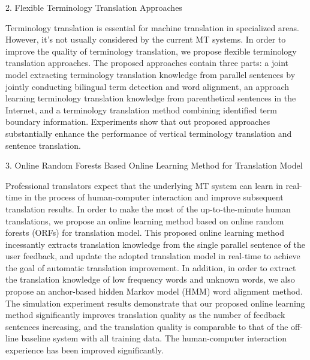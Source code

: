 2. Flexible Terminology Translation Approaches

Terminology translation is essential for machine translation in specialized areas. However, it’s not usually considered by the current MT systems. In order to improve the quality of terminology translation, we propose flexible terminology translation approaches. The proposed approaches contain three parts: a joint model extracting terminology translation knowledge from parallel sentences by jointly conducting bilingual term detection and word alignment, an approach learning terminology translation knowledge from parenthetical sentences in the Internet, and a terminology translation method combining identified term boundary information. Experiments show that out proposed approaches substantially enhance the performance of vertical terminology translation and sentence translation.

3. Online Random Forests Based Online Learning Method for Translation Model

Professional translators expect that the underlying MT system can learn in real-time in the process of human-computer interaction and improve subsequent translation results. In order to make the most of the up-to-the-minute human translations, we propose an online learning method based on online random forests (ORFs) for translation model. This proposed online learning method incessantly extracts translation knowledge from the single parallel sentence of the user feedback, and update the adopted translation model in real-time to achieve the goal of automatic translation improvement. In addition, in order to extract the translation knowledge of low frequency words and unknown words, we also propose an anchor-based hidden Markov model (HMM) word alignment method. The simulation experiment results demonstrate that our proposed online learning method significantly improves translation quality as the number of feedback sentences increasing, and the translation quality is comparable to that of the off-line baseline system with all training data. The human-computer interaction experience has been improved significantly.

